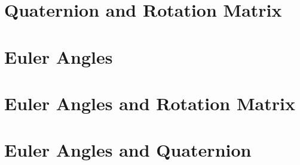 \documentclass{article}
\begin{document}
\section{Quaternion and Rotation Matrix}

\section{Euler Angles}

\section{Euler Angles and Rotation Matrix}

\section{Euler Angles and Quaternion}
\end{document}
